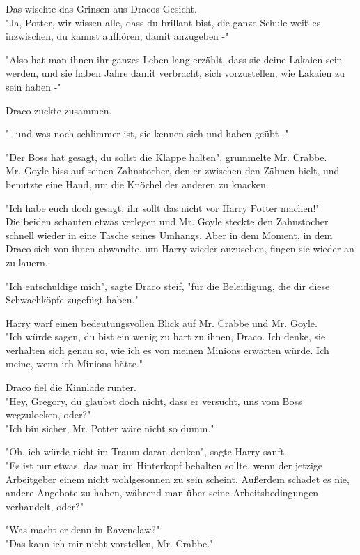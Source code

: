 {Das wischte das Grinsen aus Dracos Gesicht.\\ "Ja, Potter, wir wissen alle, dass du brillant bist, die ganze Schule weiß es inzwischen, du kannst aufhören, damit anzugeben -"

"Also hat man ihnen ihr ganzes Leben lang erzählt, dass sie deine Lakaien sein werden, und sie haben Jahre damit verbracht, sich vorzustellen, wie Lakaien zu sein haben -"

Draco zuckte zusammen.

"- und was noch schlimmer ist, sie kennen sich und haben geübt -"

"Der Boss hat gesagt, du sollst die Klappe halten", grummelte Mr. Crabbe.\\ Mr. Goyle biss auf seinen Zahnstocher, den er zwischen den Zähnen hielt, und benutzte eine Hand, um die Knöchel der anderen zu knacken.

"Ich habe euch doch gesagt, ihr sollt das nicht vor Harry Potter machen!"\\ Die beiden schauten etwas verlegen und Mr. Goyle steckte den Zahnstocher schnell wieder in eine Tasche seines Umhangs. Aber in dem Moment, in dem Draco sich von ihnen abwandte, um Harry wieder anzusehen, fingen sie wieder an zu lauern.

"Ich entschuldige mich", sagte Draco steif, "für die Beleidigung, die dir diese Schwachköpfe zugefügt haben."

Harry warf einen bedeutungsvollen Blick auf Mr. Crabbe und Mr. Goyle.\\ "Ich würde sagen, du bist ein wenig zu hart zu ihnen, Draco. Ich denke, sie verhalten sich genau so, wie ich es von meinen Minions erwarten würde. Ich meine, wenn ich Minions hätte."

Draco fiel die Kinnlade runter.\\ "Hey, Gregory, du glaubst doch nicht, dass er versucht, uns vom Boss wegzulocken, oder?"\\ "Ich bin sicher, Mr. Potter wäre nicht so dumm."

"Oh, ich würde nicht im Traum daran denken", sagte Harry sanft.\\ "Es ist nur etwas, das man im Hinterkopf behalten sollte, wenn der jetzige Arbeitgeber einem nicht wohlgesonnen zu sein scheint. Außerdem schadet es nie, andere Angebote zu haben, während man über seine Arbeitsbedingungen verhandelt, oder?"

"Was macht er denn in Ravenclaw?"\\ "Das kann ich mir nicht vorstellen, Mr. Crabbe."

}
